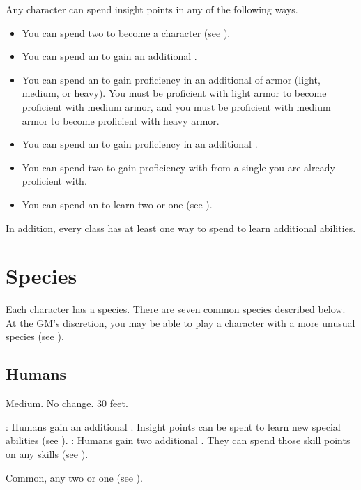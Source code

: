     Any character can spend insight points in any of the following ways.
    \begin{itemize}
        \item You can spend two  to become a  character (see ).
        \item You can spend an  to gain an additional .
        \item You can spend an  to gain proficiency in an additional  of armor (light, medium, or heavy).
            You must be proficient with light armor to become proficient with medium armor, and you must be proficient with medium armor to become proficient with heavy armor.
        \item You can spend an  to gain proficiency in an additional .
        \item You can spend two  to gain proficiency with  from a single  you are already proficient with.
        \item You can spend an  to learn two  or one  (see ).
    \end{itemize}
    In addition, every class has at least one way to spend  to learn additional abilities.

\section{Species}\label{Species}
    Each character has a species.
    There are seven common species described below.
    At the GM's discretion, you may be able to play a character with a more unusual species (see ).

    \subsection{Humans}
         Medium.
         No change.
         30 feet.
        \begin{itemize}
            : Humans gain an additional .
                Insight points can be spent to learn new special abilities (see ).
            : Humans gain two additional . They can spend those skill points on any skills (see ).
        \end{itemize}
         Common, any two  or one  (see ).

